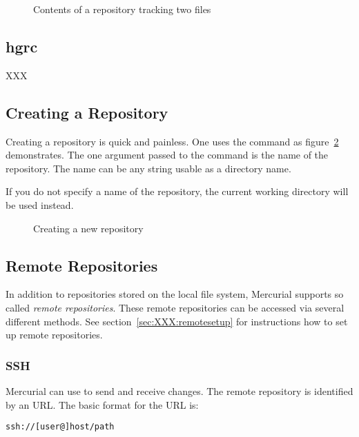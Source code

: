 \begin{figure}[ht]
  \caption{Contents of a repository tracking two files}
  \label{ex:concepts:dirlist2}
\end{figure}

\subsection{hgrc}
XXX

\subsection{Creating a Repository}
Creating a repository is quick and painless.  One uses the 
command as figure~\ref{ex:concepts:hginit} demonstrates.  The one argument
passed to the  command is the name of the repository. The name
can be any string usable as a directory name.

\begin{caution}
If you do not specify a name of the repository, the current working
directory will be used instead.
\end{caution}

\begin{figure}[ht]
  \caption{Creating a new repository}
  \label{ex:concepts:hginit}
\end{figure}

\subsection{Remote Repositories}
\label{sec:concepts:remoterepo}
In addition to repositories stored on the local file system, Mercurial
supports so called \emph{remote repositories}.  These remote repositories
can be accessed via several different methods.  See
section~\ref{sec:XXX:remotesetup} for instructions how to set up remote
repositories.

\subsubsection{SSH}
\label{sec:concepts:remoterepo:ssh}
Mercurial can use  to send and receive changes. The remote
repository is identified by an URL. The basic format for the URL is:

\begin{verbatim}
ssh://[user@]host/path
\end{verbatim}

